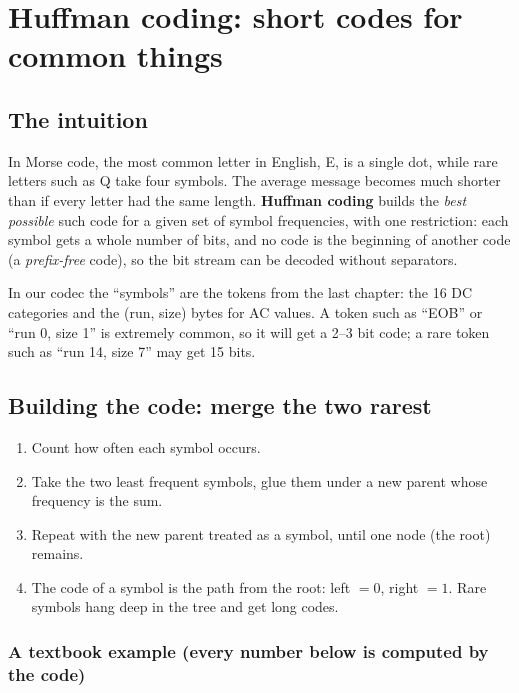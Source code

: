 \chapter{Huffman coding: short codes for common things}\label{ch:huffman}

\section{The intuition}

In Morse code, the most common letter in English, E, is a single dot, while rare letters such as Q take four symbols. The average message becomes much shorter than if every letter had the same length. \textbf{Huffman coding} builds the \emph{best possible} such code for a given set of symbol frequencies, with one restriction: each symbol gets a whole number of bits, and no code is the beginning of another code (a \emph{prefix-free} code), so the bit stream can be decoded without separators.

In our codec the ``symbols'' are the tokens from the last chapter: the 16 DC categories and the (run, size) bytes for AC values. A token such as ``EOB'' or ``run 0, size 1'' is extremely common, so it will get a 2--3 bit code; a rare token such as ``run 14, size 7'' may get 15 bits.

\section{Building the code: merge the two rarest}

\begin{enumerate}
\item Count how often each symbol occurs.
\item Take the two least frequent symbols, glue them under a new parent whose frequency is the sum.
\item Repeat with the new parent treated as a symbol, until one node (the root) remains.
\item The code of a symbol is the path from the root: left $=0$, right $=1$. Rare symbols hang deep in the tree and get long codes.
\end{enumerate}

\subsection{A textbook example (every number below is computed by the code)}

